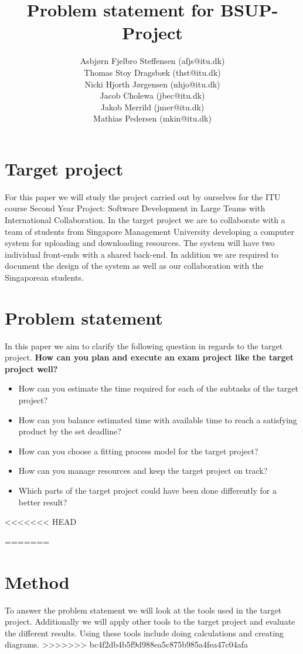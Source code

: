 \documentclass[]{article}
\title{Problem statement for BSUP-Project}
\author{Asbj\o rn Fjelbro Steffensen (afjs@itu.dk)\\ Thomas Stoy Dragsb\ae k (thst@itu.dk)\\ Nicki Hjorth J\o rgensen (nhjo@itu.dk)\\ Jacob Cholewa (jbec@itu.dk)\\ Jakob Merrild (jmer@itu.dk)\\ Mathias Pedersen (mkin@itu.dk)}
\begin{document}
\maketitle

\section*{Target project}
For this paper we will study the project carried out by ourselves for the ITU course 
Second Year Project: Software Development in Large Teams with International Collaboration.
In the target project we are to collaborate with a team of students from Singapore Management University
developing a computer system for uploading and downloading resources. The system will have two
individual front-ends with a shared back-end. In addition we are required to document the design
of the system as well as our collaboration with the Singaporean students.

\section*{Problem statement}
In this paper we aim to clarify the following question in regards to the target project.
\newline	
\textbf{How can you plan and execute an exam project like the target project well?}
\begin{itemize}
	\item	How can you estimate the time required for each of the subtasks of the target project?
	\item 	How can you balance estimated time with available time to reach a satisfying product by the set deadline?
	\item 	How can you choose a fitting process model for the target project?
	\item 	How can you manage resources and keep the target project on track?
	\item 	Which parts of the target project could have been done differently for a better result?
\end{itemize}

<<<<<<< HEAD
\newpage
{}


=======
\section*{Method}
To answer the problem statement we will look at the tools used in the target project. Additionally we will apply other tools to the target project and evaluate the different results. Using these tools include doing calculations and creating diagrams.
>>>>>>> bc4f2db4b5f9d988ea5c875b985a4fea47c04afa
\end{document}
